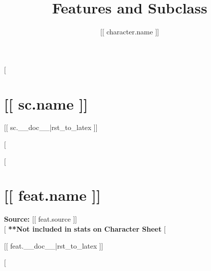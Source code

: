 \documentclass[twocolumn,lettersize]{article}
\title{Features and Subclass}
\author{[[ character.name ]]}
\date{}
\begin{document}
\maketitle

[%

  \section*{[[ sc.name ]]}

  [[ sc.__doc__|rst_to_latex ]]

[%
  
[%

  \section*{[[ feat.name ]]}

  \noindent
  \textbf{Source:} [[ feat.source ]] \\

  [%
    \textbf{**Not included in stats on Character Sheet} %
  [%
             
  [[ feat.__doc__|rst_to_latex ]]

[%
\end{document}
